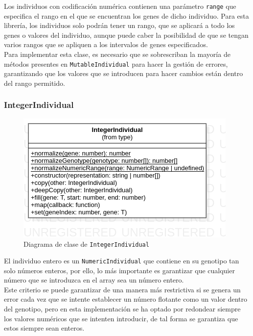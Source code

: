 Los individuos con codificación numérica contienen una parámetro \texttt{range} que especifica el rango en el que se encuentran los genes de dicho individuo. Para esta librería, los individuos solo podrán tener un rango, que se aplicará a todo los genes o valores del individuo, aunque puede caber la posibilidad de que se tengan varios rangos que se apliquen a los intervalos de genes especificados. \\

Para implementar esta clase, es necesario que se sobrescriban la mayoría de métodos presentes en \texttt{MutableIndividual} para hacer la gestión de errores, garantizando que los valores que se introducen para hacer cambios están dentro del rango permitido.

\subsubsection{IntegerIndividual}

\begin{figure}[ht]
    \centering
    \includegraphics[scale=0.7]{mem/images/cap-4/4.2.2(Individuos)/IntegerIndividual.png}
    \caption{Diagrama de clase de \texttt{IntegerIndividual}}
    \label{fig:binaryindividual-uml}
\end{figure}

El individuo entero es un \texttt{NumericIndividual} que contiene en su genotipo tan solo números enteros, por ello, lo más importante es garantizar que cualquier número que se introduzca en el array sea un número entero. \\

Este criterio se puede garantizar de una manera más restrictiva si se genera un error cada vez que se intente establecer un número flotante como un valor dentro del genotipo, pero en esta implementación se ha optado por redondear siempre los valores numéricos que se intenten introducir, de tal forma se garantiza que estos siempre sean enteros. \\

